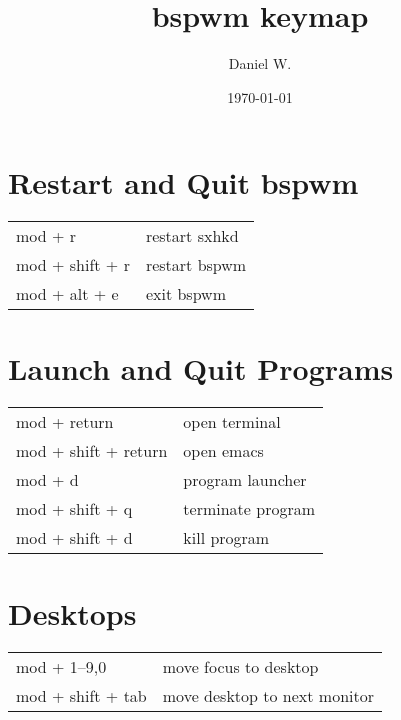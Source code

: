 \documentclass[
    10pt,
    a4paper,
    notitlepage,
]{scrartcl}
\title{bspwm keymap}
\author{Daniel W.}
\date{\today}
\begin{document}
\maketitle

\section{Restart and Quit bspwm}
\begin{tabular}{p{4cm}l}
    mod + r             & restart sxhkd                         \\
    mod + shift + r     & restart bspwm                         \\
    mod + alt + e       & exit bspwm
\end{tabular}

\section{Launch and Quit Programs}
\begin{tabular}{p{4cm}l}
    mod + return            & open terminal                         \\
    mod + shift + return    & open emacs                            \\
    mod + d                 & program launcher                      \\
    mod + shift + q         & terminate program                     \\
    mod + shift + d         & kill program
\end{tabular}

\section{Desktops}
\begin{tabular}{p{4cm}l}
    mod + 1--9,0          & move focus to desktop         \\
    mod + shift + tab     & move desktop to next monitor
\end{tabular}
\end{document}

